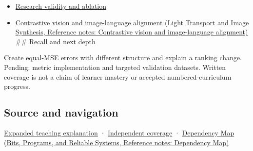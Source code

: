 \begin{itemize}
\item
  \hyperref[appendix-65788587ef78]{Research validity and ablation}
\item
  \href{../04-Light-Transport-and-Image-Synthesis/main.pdf\#nameddest=appendix-772f1fd96148}{Contrastive vision and image-language alignment (Light Transport and Image Synthesis, Reference notes: Contrastive vision and image-language alignment)} \#\# Recall and next depth
\end{itemize}

Create equal-MSE errors with different structure and explain a ranking change. Pending: metric implementation and targeted validation datasets. Written coverage is not a claim of learner mastery or accepted numbered-curriculum progress.

\subsection{Source and navigation}\label{appendix-b2c1846508bf-source-and-navigation}

\hyperref[04-visual-computing-ii-ch042-quality-numbers-need-a-question-they-can-actually-answer]{Expanded teaching explanation} · \hyperref[appendix-fd090d982a15-xr01---independent-seeing-and-representation-source]{Independent coverage} · \href{../01-Bits-Programs-and-Reliable-Systems/main.pdf\#nameddest=appendix-4ad47bdd269a}{Dependency Map (Bits, Programs, and Reliable Systems, Reference notes: Dependency Map)}
